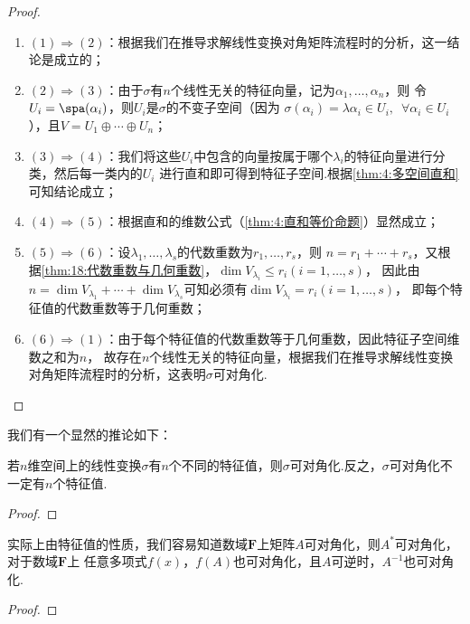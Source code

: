 \begin{proof}
    \begin{enumerate}[label=(\arabic*)]
        \item $(1)\Rightarrow(2)$：根据我们在推导求解线性变换对角矩阵流程时的分析，这一结论是成立的；
        \item $(2)\Rightarrow(3)$：由于$\sigma$有$n$个线性无关的特征向量，记为$\alpha_1,\ldots,\alpha_n$，则
        令$U_i=\spa(\alpha_i)$，则$U_i$是$\sigma$的不变子空间（因为
        $\sigma(\alpha_i)=\lambda\alpha_i\in U_i,\enspace\forall\alpha_i\in U_i$），且$V=U_1\oplus\cdots\oplus U_n$；
        \item $(3)\Rightarrow(4)$：我们将这些$U_i$中包含的向量按属于哪个$\lambda_i$的特征向量进行分类，然后每一类内的$U_i$
        进行直和即可得到特征子空间.根据\autoref{thm:4:多空间直和}可知结论成立；
        \item $(4)\Rightarrow(5)$：根据直和的维数公式（\autoref{thm:4:直和等价命题}）显然成立；
        \item $(5)\Rightarrow(6)$：设$\lambda_1,\ldots,\lambda_s$的代数重数为$r_1,\ldots,r_s$，则
        $n=r_1+\cdots+r_s$，又根据\autoref{thm:18:代数重数与几何重数}，$\dim V_{\lambda_i}\leqslant r_i(i=1,\ldots,s)$，
        因此由$n=\dim V_{\lambda_1}+\cdots+\dim V_{\lambda_s}$可知必须有$\dim V_{\lambda_i}=r_i(i=1,\ldots,s)$，
        即每个特征值的代数重数等于几何重数；
        \item $(6)\Rightarrow(1)$：由于每个特征值的代数重数等于几何重数，因此特征子空间维数之和为$n$，
        故存在$n$个线性无关的特征向量，根据我们在推导求解线性变换对角矩阵流程时的分析，这表明$\sigma$可对角化.
    \end{enumerate}
\end{proof}

我们有一个显然的推论如下：
\begin{corollary}
    若$n$维空间上的线性变换$\sigma$有$n$个不同的特征值，则$\sigma$可对角化.反之，$\sigma$可对角化不一定有$n$个特征值.
\end{corollary}
\begin{proof}
    
\end{proof}

实际上由特征值的性质，我们容易知道数域$\mathbf{F}$上矩阵$A$可对角化，则$A^*$可对角化，对于数域$\mathbf{F}$上
任意多项式$f(x)$，$f(A)$也可对角化，且$A$可逆时，$A^{-1}$也可对角化.

\begin{proof}
    
\end{proof}

